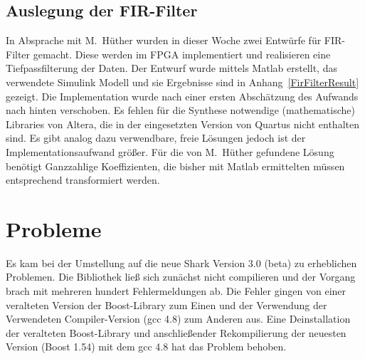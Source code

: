 \documentclass[a4paper,12pt,fleqn]{article}
\begin{document}
\subsection{Auslegung der FIR-Filter}
%
In Absprache mit M.~Hüther wurden in dieser Woche zwei Entwürfe für FIR-Filter gemacht. Diese werden im FPGA implementiert und realisieren eine Tiefpassfilterung der Daten. Der Entwurf wurde mittels Matlab erstellt, das verwendete Simulink Modell und sie Ergebnisse sind in Anhang~\ref{FirFilterResult} gezeigt. Die Implementation wurde nach einer ersten Abschätzung des Aufwands nach hinten verschoben. Es fehlen für die Synthese notwendige (mathematische) Libraries von Altera, die in der eingesetzten Version von Quartus nicht enthalten sind. Es gibt analog dazu verwendbare, freie Lösungen jedoch ist der Implementationsaufwand größer. Für die von M.~Hüther gefundene Lösung benötigt Ganzzahlige Koeffizienten, die bisher mit Matlab ermittelten müssen entsprechend transformiert werden.
%
\section{Probleme}
\label{Problems}
%
Es kam bei der Umstellung auf die neue Shark Version 3.0 (beta) zu erheblichen Problemen. Die Bibliothek ließ sich zunächst nicht compilieren und der Vorgang brach mit mehreren hundert Fehlermeldungen ab. Die Fehler gingen von einer veralteten Version der Boost-Library zum Einen und der Verwendung der Verwendeten Compiler-Version (gcc 4.8) zum Anderen aus. Eine Deinstallation der veralteten Boost-Library und anschließender Rekompilierung der neuesten Version (Boost 1.54) mit dem gcc 4.8 hat das Problem behoben.
%


\newpage


\end{document}
